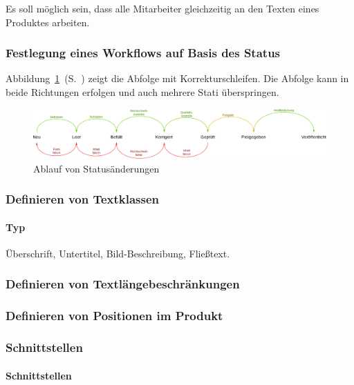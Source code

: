 Es soll möglich sein, dass alle  Mitarbeiter gleichzeitig an den Texten eines Produktes arbeiten.

\subsubsection{Festlegung eines Workflows auf Basis des Status}

Abbildung~\ref{chart:statimitworkflow}~(S.~\pageref{chart:statimitworkflow}) zeigt die Abfolge mit Korrekturschleifen. Die Abfolge kann in beide Richtungen erfolgen und auch mehrere Stati überspringen.

\begin{figure}[htb]
\begin{center}
\includegraphics[width=\textwidth]{media/stati-mit-workflow.pdf}
\end{center}
\caption{Ablauf von Statusänderungen}
\label{chart:statimitworkflow}
\end{figure}

\subsubsection{Definieren von Textklassen}

\paragraph{Typ} Überschrift, Untertitel, Bild-Beschreibung, Fließtext.

\subsubsection{Definieren von Textlängebeschränkungen}

\subsubsection{Definieren von Positionen im Produkt}

\subsubsection{Schnittstellen}

\paragraph{Schnittstellen}

